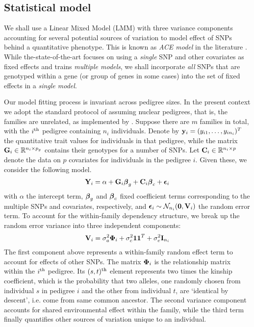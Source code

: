 \subsection{Statistical model}
We shall use a Linear Mixed Model (LMM) with three variance components accounting for several potential sources of variation to model effect of SNPs behind a quantitative phenotype. This is known as \textit{ACE model} in the literature \citep{KohlerEtal11}. While the-state-of-the-art focuses on using a \textit{single} SNP and other covariates as fixed effects and trains {\it multiple models}, we shall incorporate \textit{all} SNPs that are genotyped within a gene (or group of genes in some cases) into the set of fixed effects in a \textit{single model}.

Our model fitting process is invariant across pedigree sizes.  In the present context we adopt the standard protocol of assuming nuclear pedigrees, that is, the families are unrelated, as implemented by \cite{ChenAbecasis07,LiEtal11,McGueEtal13}. Suppose there are $m$ families in total, with the $i^{\operatorname*{\text{th}}}$ pedigree containing $n_i$ individuals. Denote by ${\bf{y}}_i = (y_{i 1}, \ldots, y_{i n_i})^T $ the quantitative trait values for individuals in that pedigree, while the matrix ${\mathbf{G}}_i \in {\mathbb{R}}^{ n_i \times p_g}$ contains their genotypes for a number of SNPs. Let ${\mathbf{C}}_i \in {\mathbb{R}}^{ n_i \times p}$ denote the data on $p$ covariates for individuals in the pedigree $i$. Given these, we consider the following model.
%
\begin{align}\label{eqn:LMMeqn}
{\mathbf{Y}}_i = \alpha + {\mathbf{G}}_i {\boldsymbol{\beta}}_g + {\mathbf{C}}_i {\boldsymbol{\beta}}_c + {\boldsymbol{\epsilon}}_i
\end{align}
%
with $\alpha$ the intercept term, ${\boldsymbol{\beta}}_g$ and ${\boldsymbol{\beta}}_c$ fixed coefficient terms corresponding to the multiple SNPs and covariates, respectively, and ${\boldsymbol{\epsilon}}_i \sim {\cal{N}}_{n_i} ({\bf 0}, {\mathbf{V}}_i)$ the random error term. To account for the within-family dependency structure, we break up the random error variance into three independent components:
%
\begin{align}\label{eqn:partsOfV}
{\mathbf{V}}_i = \sigma_a^2 {\boldsymbol{\Phi}}_i + \sigma_c^2 {\bf 1} {\bf 1}^T + \sigma_e^2 {\mathbf{I}}_{n_i}
\end{align}
%
The first component above represents a within-family random effect term to account for effects of other SNPs. The matrix ${\boldsymbol{\Phi}}_i$ is the relationship matrix within the $i^{\operatorname*{\text{th}}}$ pedigree. Its $(s,t)^{\operatorname*{\text{th}}}$ element represents two times the kinship coefficient, which is the probability that two alleles, one randomly chosen from individual $s$ in pedigree $i$ and the other from individual $t$, are `identical by descent', i.e. come from same common ancestor. The second variance component accounts for shared environmental effect within the family, while the third term finally quantifies other sources of variation unique to an individual.

